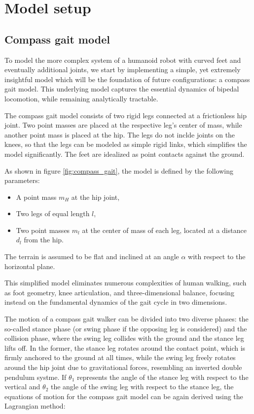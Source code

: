 \chapter{Model setup}

\section{Compass gait model}
To model the more complex system of a humanoid robot with curved feet and eventually additional joints, we start by implementing a simple, yet extremely insightful model which will be the foundation of future configurations: a compass gait model.
This underlying model captures the essential dynamics of bipedal locomotion, while remaining analytically tractable. 

The compass gait model consists of two rigid legs connected at a frictionless hip joint. Two point masses are placed at the respective leg's center of mass, while another point mass is placed at the hip.
The legs do not inclde joints on the knees, so that the legs can be modeled as simple rigid links, which simplifies the model significantly. 
The feet are idealized as point contacts against the ground. 

As shown in figure \ref{fig:compass_gait}, the model is defined by the following parameters:
\begin{itemize}
    \item A point mass $m_H$ at the hip joint,
    \item Two legs of equal length $l$,
    \item Two point masses $m_l$ at the center of mass of each leg, located at a distance $d_l$ from the hip.
\end{itemize}
The terrain is assumed to be flat and inclined at an angle $\alpha$ with respect to the horizontal plane.

This simplified model eliminates numerous complexities of human walking, such as foot geometry, knee articulation, and three-dimensional balance, focusing instead on the fundamental dynamics of the gait cycle in two dimensions.

The motion of a compass gait walker can be divided into two diverse phases: the so-called stance phase (or swing phase if the opposing leg is considered) and the collision phase, where the swing leg collides with the ground and the stance leg lifts off.
In the former, the stance leg rotates around the contact point, which is firmly anchored to the ground at all times, while the swing leg freely rotates around the hip joint due to gravitational forces, resembling an inverted double pendulum systme.
If $\theta_1$ represents the angle of the stance leg with respect to the vertical and $\theta_2$ the angle of the swing leg with respect to the stance leg, the equations of motion for the compass gait model can be again derived using the Lagrangian method:

